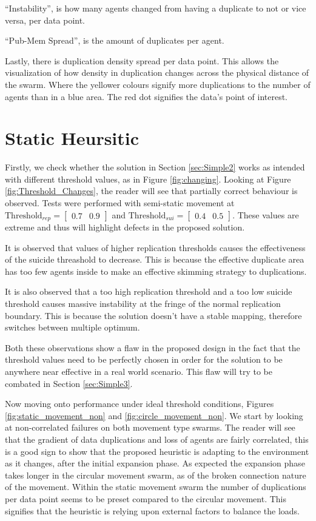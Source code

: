 \documentclass{UoYCSproject}
\begin{document}
“Instability”, is how many agents changed from having a duplicate to not or vice versa, per data point.

“Pub-Mem Spread”, is the amount of duplicates per agent.

Lastly, there is duplication density spread per data point. 
This allows the visualization of how density in duplication changes across the physical distance of the swarm. 
Where the yellower colours signify more duplications to the number of agents than in a blue area. 
The red dot signifies the data’s point of interest.


\section{Static Heursitic}
\label{sec:Simple2a}

Firstly, we check whether the solution in Section \ref{sec:Simple2} works as intended with different threshold values, as in Figure \ref{fig:changing}. 
Looking at Figure \ref{fig:Threshold_Changes}, the reader will see that partially correct behaviour is observed. 
Tests were performed with semi-static movement at $\text{Threshold}_{rep} = \begin{bmatrix} 0.7 & 0.9 \end{bmatrix}$ and $\text{Threshold}_{sui} = \begin{bmatrix} 0.4 & 0.5 \end{bmatrix}$. 
These values are extreme and thus will highlight defects in the proposed solution.

It is observed that values of higher replication thresholds causes the effectiveness of the suicide threashold to decrease. 
This is because the effective duplicate area has too few agents inside to make an effective skimming strategy to duplications. 

It is also observed that a too high replication threshold and a too low suicide threshold causes massive instability at the fringe of the normal replication boundary. 
This is because the solution doesn’t have a stable mapping, therefore switches between multiple optimum.

Both these observations show a flaw in the proposed design in the fact that the threshold values need to be perfectly chosen in order for the solution to be anywhere near effective in a real world scenario. 
This flaw will try to be combated in Section \ref{sec:Simple3}.

Now moving onto performance under ideal threshold conditions, Figures \ref{fig:static_movement_non} and \ref{fig:circle_movement_non}. 
We start by looking at non-correlated failures on both movement type swarms. 
The reader will see that the gradient of data duplications and loss of agents are fairly correlated, this is a good sign to show that the proposed heuristic is adapting to the environment as it changes, after the initial expansion phase. 
As expected the expansion phase takes longer in the circular movement swarm, as of the broken connection nature of the movement. 
Within the static movement swarm the number of duplications per data point seems to be preset compared to the circular movement. 
This signifies that the heuristic is relying upon external factors to balance the loads.
\end{document}
